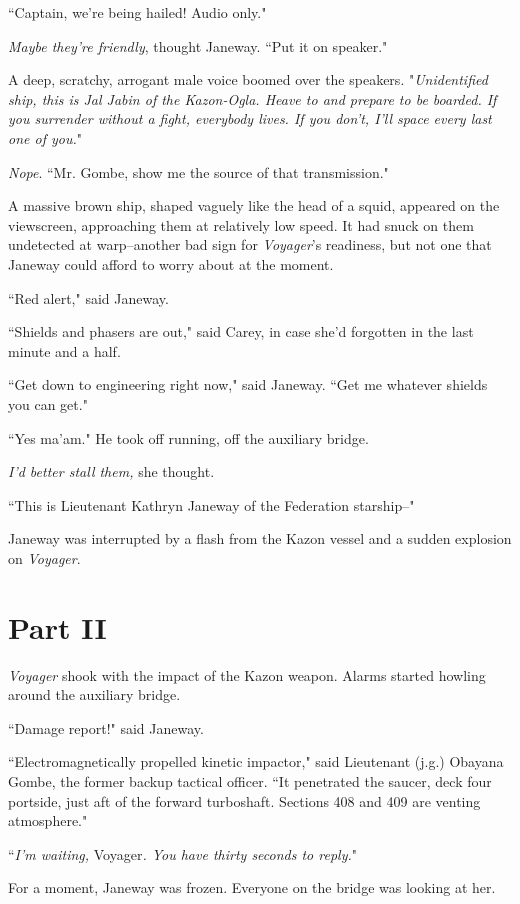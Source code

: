 \documentclass[twoside,letterpaper,12pt]{memoir}
\begin{document}
``Captain, we're being hailed! Audio only."

\textit{Maybe they're friendly}, thought Janeway. ``Put it on speaker."

A deep, scratchy, arrogant male voice boomed over the speakers. "\textit{Unidentified ship, this is Jal Jabin of the Kazon-Ogla. Heave to and prepare to be boarded. If you surrender without a fight, everybody lives. If you don't, I'll space every last one of you.}"

\textit{Nope}. ``Mr. Gombe, show me the source of that transmission."

A massive brown ship, shaped vaguely like the head of a squid, appeared on the viewscreen, approaching them at relatively low speed. It had snuck on them undetected at warp--another bad sign for \textit{Voyager}'s readiness, but not one that Janeway could afford to worry about at the moment.

``Red alert," said Janeway.

``Shields and phasers are out," said Carey, in case she’d forgotten in the last minute and a half.

``Get down to engineering right now," said Janeway. ``Get me whatever shields you can get."

``Yes ma'am." He took off running, off the auxiliary bridge.

\textit{I'd better stall them, }she thought.

``This is Lieutenant Kathryn Janeway of the Federation starship--"

Janeway was interrupted by a flash from the Kazon vessel and a sudden explosion on \textit{Voyager}.

\chapter*{Part II}

\textit{Voyager} shook with the impact of the Kazon weapon. Alarms started howling around the auxiliary bridge.

``Damage report!" said Janeway.

``Electromagnetically propelled kinetic impactor," said Lieutenant (j.g.) Obayana Gombe, the former backup tactical officer. ``It penetrated the saucer, deck four portside, just aft of the forward turboshaft. Sections 408 and 409 are venting atmosphere."

``\textit{I'm waiting, }Voyager\textit{. You have thirty seconds to reply.}"

For a moment, Janeway was frozen. Everyone on the bridge was looking at her.
\end{document}
